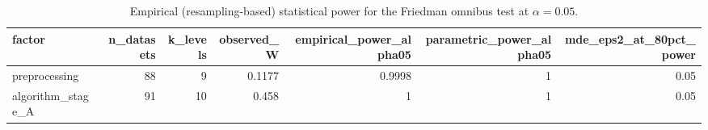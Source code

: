 \begin{table}
\caption{Empirical (resampling-based) statistical power for the Friedman omnibus test at $\alpha=0.05$.}
\label{tab:empirical_power}
\begin{tabular}{lrrrrrr}
\toprule
factor & n\_datasets & k\_levels & observed\_W & empirical\_power\_alpha05 & parametric\_power\_alpha05 & mde\_eps2\_at\_80pct\_power \\
\midrule
preprocessing & 88 & 9 & 0.1177 & 0.9998 & 1 & 0.05 \\
algorithm\_stage\_A & 91 & 10 & 0.458 & 1 & 1 & 0.05 \\
\bottomrule
\end{tabular}
\end{table}
